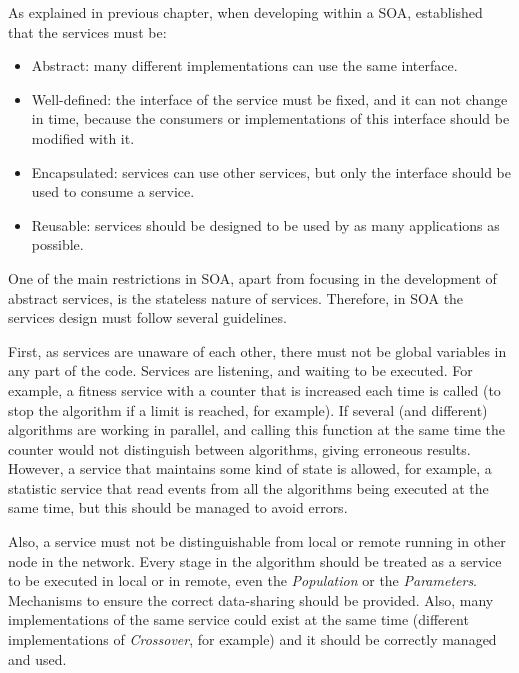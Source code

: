 As explained in previous chapter, when developing within a SOA,  \cite{Papazoglou2007SOA} established that the services must be: 
\begin{itemize}
\item Abstract: many different implementations can use the same interface.
\item Well-defined: the interface of the service must be fixed, and it can not change in time, because the consumers or implementations of this interface should be modified with it.
\item Encapsulated: services can use other services, but only the interface should be used to consume a service.
\item Reusable: services should be designed to be used by as many applications as possible. 
\end{itemize}

One of the main restrictions in SOA, %
 apart from focusing in the development of abstract services, is the
 stateless nature of services. Therefore, in SOA the services design
 must follow several guidelines. %

First, as services are unaware of each other, there must not be global
variables in any part of the code. Services are listening, and waiting
to be executed. For example, a fitness service with a counter that is
increased each time is called (to stop the algorithm if a limit is
reached, for example). If several (and different) algorithms are
working in parallel, and calling this function at the same time the
counter would not distinguish between algorithms, giving erroneous
results. However, a service that maintains some kind of state is
allowed, for example, a statistic service that read events from all
the algorithms being executed at the same time, but this should be
managed to avoid errors. %

Also, a service must not be distinguishable from local or remote
running in other node in the network. %
Every stage in the algorithm should be treated as a service to be
executed in local or in remote, even the {\em Population} or the {\em
  Parameters}. Mechanisms to ensure the correct data-sharing should be
provided. Also, many implementations of the same service could exist
at the same time (different implementations of {\em Crossover}, for
example) and it should be correctly managed and used. %

